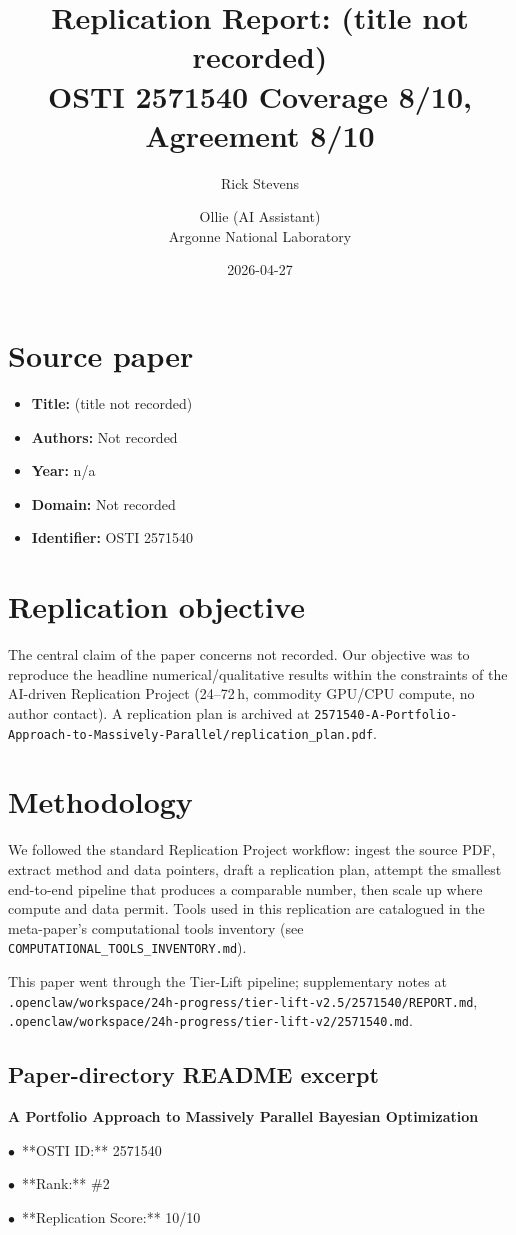 \documentclass[11pt]{article}
\title{Replication Report: (title not recorded)\\[2pt]\large OSTI 2571540 \textbar{} Coverage 8/10, Agreement 8/10}
\author{Rick Stevens \and Ollie (AI Assistant)\\\small Argonne National Laboratory}
\date{2026-04-27}
\begin{document}
\maketitle

\section{Source paper}
\begin{itemize}
\item \textbf{Title:} (title not recorded)
\item \textbf{Authors:} Not recorded
\item \textbf{Year:} n/a
\item \textbf{Domain:} Not recorded
\item \textbf{Identifier:} OSTI 2571540
\end{itemize}


\section{Replication objective}
The central claim of the paper concerns not recorded. Our objective was to reproduce the headline numerical/qualitative results within the constraints of the AI-driven Replication Project (24--72\,h, commodity GPU/CPU compute, no author contact). A replication plan is archived at \texttt{2571540-A-Portfolio-Approach-to-Massively-Parallel/replication\_plan.pdf}.

\section{Methodology}
We followed the standard Replication Project workflow: ingest the source PDF, extract method and data pointers, draft a replication plan, attempt the smallest end-to-end pipeline that produces a comparable number, then scale up where compute and data permit. Tools used in this replication are catalogued in the meta-paper's computational tools inventory (see \texttt{COMPUTATIONAL\_TOOLS\_INVENTORY.md}).

This paper went through the Tier-Lift pipeline; supplementary notes at \texttt{.openclaw/workspace/24h-progress/tier-lift-v2.5/2571540/REPORT.md}, \texttt{.openclaw/workspace/24h-progress/tier-lift-v2/2571540.md}.

\subsection*{Paper-directory README excerpt}
\small
\par\medskip\textbf{A Portfolio Approach to Massively Parallel Bayesian Optimization}\par
\par$\bullet$\ **OSTI ID:** 2571540
\par$\bullet$\ **Rank:** \#2
\par$\bullet$\ **Replication Score:** 10/10
\end{document}
